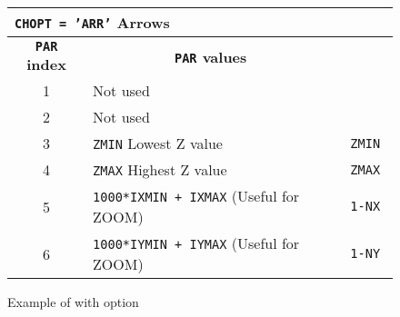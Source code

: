 \begin{figure}[p]
\begin{center}
\begin{tabular}{||c|p{12cm}|>{\tt}r||}
\hline
\multicolumn{3}{||l||}{\bf {\tt CHOPT = 'ARR'} Arrows}
\\
\hline
\multicolumn{1}{||c|}{\bf {\tt PAR} index}        &
\multicolumn{1}{c|}{\bf {\tt PAR} values}         &
\multicolumn{1}{c||}{\bf default}                \\
\hline
 1  & Not used                                                      &         \\
 2  & Not used                                                      &         \\
 3  & {\tt ZMIN} Lowest Z value                                     &   ZMIN  \\
 4  & {\tt ZMAX} Highest Z value                                    &   ZMAX  \\
 5  & {\tt 1000*IXMIN + IXMAX} (Useful for ZOOM)                    &   1-NX  \\
 6  & {\tt 1000*IYMIN + IYMAX} (Useful for ZOOM)                    &   1-NY  \\
\hline
\end{tabular}
\end{center}
\bigskip
\begin{center} \mbox{} \end{center}
\caption{Example of \protect{} with \protect{} option}
\end{figure}

